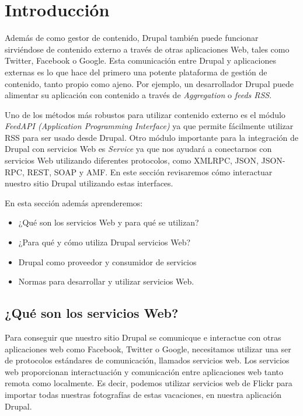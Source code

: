 \chapter{Introducción}
\newpage

Además de como gestor de contenido, Drupal también puede funcionar sirviéndose de contenido externo 
a través de otras aplicaciones Web, tales como Twitter, Facebook o Google. Esta comunicación entre 
Drupal y aplicaciones externas es lo que hace del primero una potente plataforma de gestión 
de contenido, tanto propio como ajeno. Por ejemplo, un desarrollador Drupal puede alimentar su aplicación
con contenido a través de \emph{Aggregation} o \emph{feeds RSS}. 

Uno de los métodos más robustos para utilizar contenido externo es el módulo 
\emph{FeedAPI (Application Programming Interface)} ya que permite fácilmente utilizar RSS 
para ser usado desde Drupal. Otro módulo importante para la integración de Drupal con servicios Web es 
\emph{Service} ya que nos ayudará a conectarnos con servicios Web utilizando diferentes protocolos, como
XMLRPC, JSON, JSON-RPC, REST, SOAP y AMF. En este sección revisaremos cómo interactuar nuestro sitio Drupal
utilizando estas interfaces.

En esta sección además aprenderemos:

\begin{itemize}
  \item ¿Qué son los servicios Web y para qué se utilizan?
  \item ¿Para qué y cómo utiliza Drupal servicios Web?
  \item Drupal como proveedor y consumidor de servicios
  \item Normas para desarrollar y utilizar servicios Web.
\end{itemize}

\section{¿Qué son los servicios Web?}

Para conseguir que nuestro sitio Drupal se comunicque e interactue con otras aplicaciones web como
Facebook, Twitter o Google, necesitamos utilizar una ser de protocolos estándares de comunicación, 
llamados servicios web. Los servicios web proporcionan interactuación y comunicación entre aplicaciones 
web tanto remota como localmente. Es decir, podemos utilizar servicios web de Flickr para importar todas 
nuestras fotografías de estas vacaciones, en nuestra aplicación Drupal.

